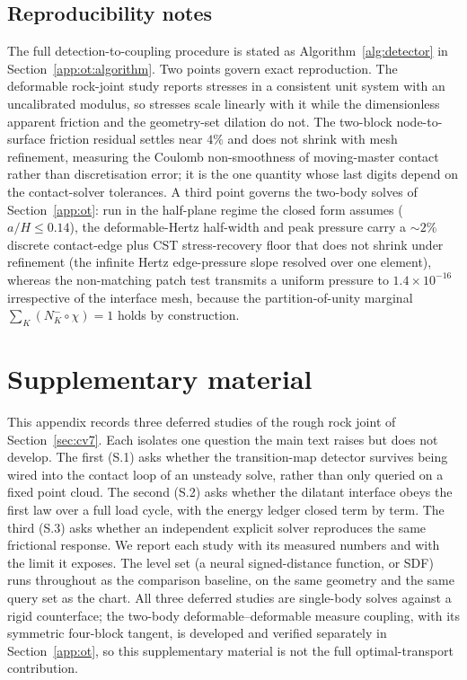 \documentclass{svjour3}                 %
\begin{document}
\begin{appendix}
\subsection{Reproducibility notes}

The full detection-to-coupling procedure is stated as Algorithm~\ref{alg:detector} in
Section~\ref{app:ot:algorithm}. Two points govern exact reproduction. The deformable rock-joint study reports stresses in a consistent unit
system with an uncalibrated modulus, so stresses scale linearly with it while the dimensionless apparent
friction and the geometry-set dilation do not. The two-block node-to-surface friction residual settles near
$4\%$ and does not shrink with mesh refinement, measuring the Coulomb non-smoothness of moving-master contact
rather than discretisation error; it is the one quantity whose last digits depend on the contact-solver
tolerances. A third point governs the two-body solves of Section~\ref{app:ot}: run in the half-plane regime the
closed form assumes ($a/H\le0.14$), the deformable-Hertz half-width and peak pressure carry a $\sim2\%$ discrete
contact-edge plus CST stress-recovery floor that does not shrink under refinement (the infinite Hertz
edge-pressure slope resolved over one element), whereas the non-matching patch test transmits a uniform
pressure to $1.4\times10^{-16}$ irrespective of the interface mesh, because the partition-of-unity marginal
$\sum_K(N_K^-\!\circ\chi)=1$ holds by construction.

\section{Supplementary material}\label{app:supp}

This appendix records three deferred studies of the rough rock joint of Section~\ref{sec:cv7}. Each
isolates one question the main text raises but does not develop. The first (S.1) asks whether
the transition-map detector survives being wired into the contact loop of an unsteady solve, rather than
only queried on a fixed point cloud. The second (S.2) asks whether the dilatant interface obeys the first
law over a full load cycle, with the energy ledger closed term by term. The third (S.3) asks whether an
independent explicit solver reproduces the same frictional response. We report each study with its
measured numbers and with the limit it exposes. The level set (a neural signed-distance function, or SDF)
runs throughout as the comparison baseline, on the same geometry and the same query set as the chart. All
three deferred studies are single-body solves against a rigid counterface; the two-body
deformable--deformable measure coupling, with its symmetric four-block tangent, is developed and verified
separately in Section~\ref{app:ot}, so this supplementary material is not the full optimal-transport
contribution.


\end{appendix}
\end{document}
